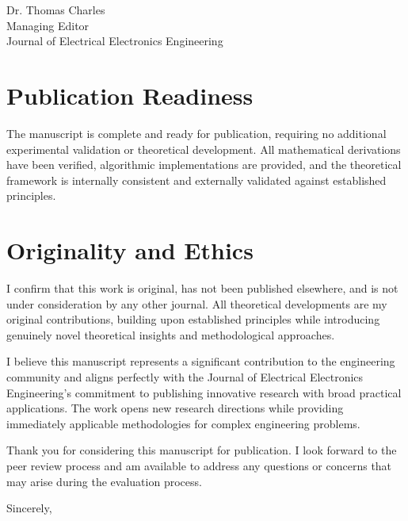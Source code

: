 \documentclass[12pt,a4paper]{letter}
\begin{document}
\begin{letter}{Dr. Thomas Charles\\
Managing Editor\\
Journal of Electrical Electronics Engineering}
\section*{Publication Readiness}

The manuscript is complete and ready for publication, requiring no additional experimental validation or theoretical development. All mathematical derivations have been verified, algorithmic implementations are provided, and the theoretical framework is internally consistent and externally validated against established principles.

\section*{Originality and Ethics}

I confirm that this work is original, has not been published elsewhere, and is not under consideration by any other journal. All theoretical developments are my original contributions, building upon established principles while introducing genuinely novel theoretical insights and methodological approaches.

I believe this manuscript represents a significant contribution to the engineering community and aligns perfectly with the Journal of Electrical Electronics Engineering's commitment to publishing innovative research with broad practical applications. The work opens new research directions while providing immediately applicable methodologies for complex engineering problems.

Thank you for considering this manuscript for publication. I look forward to the peer review process and am available to address any questions or concerns that may arise during the evaluation process.

\closing{Sincerely,}

\end{letter}
\end{document}

